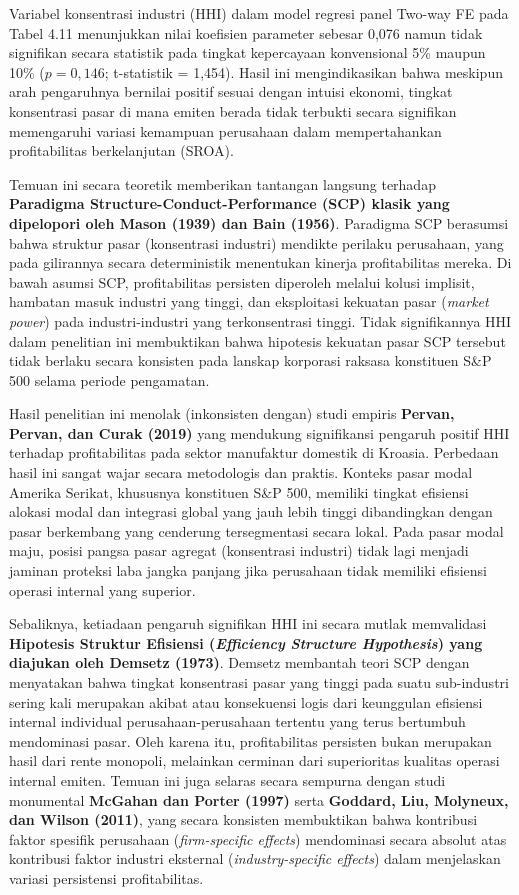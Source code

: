 \documentclass[12pt,a4paper]{article}
\begin{document}
Variabel konsentrasi industri (HHI) dalam model regresi panel Two-way FE
pada Tabel 4.11 menunjukkan nilai koefisien parameter sebesar 0,076
namun tidak signifikan secara statistik pada tingkat kepercayaan
konvensional 5\% maupun 10\% (\(p = 0,146\); t-statistik = 1,454). Hasil
ini mengindikasikan bahwa meskipun arah pengaruhnya bernilai positif
sesuai dengan intuisi ekonomi, tingkat konsentrasi pasar di mana emiten
berada tidak terbukti secara signifikan memengaruhi variasi kemampuan
perusahaan dalam mempertahankan profitabilitas berkelanjutan (SROA).

Temuan ini secara teoretik memberikan tantangan langsung terhadap
\textbf{Paradigma Structure-Conduct-Performance (SCP) klasik yang
dipelopori oleh Mason (1939) dan Bain (1956)}. Paradigma SCP berasumsi
bahwa struktur pasar (konsentrasi industri) mendikte perilaku
perusahaan, yang pada gilirannya secara deterministik menentukan kinerja
profitabilitas mereka. Di bawah asumsi SCP, profitabilitas persisten
diperoleh melalui kolusi implisit, hambatan masuk industri yang tinggi,
dan eksploitasi kekuatan pasar (\emph{market power}) pada
industri-industri yang terkonsentrasi tinggi. Tidak signifikannya HHI
dalam penelitian ini membuktikan bahwa hipotesis kekuatan pasar SCP
tersebut tidak berlaku secara konsisten pada lanskap korporasi raksasa
konstituen S\&P 500 selama periode pengamatan.

Hasil penelitian ini menolak (inkonsisten dengan) studi empiris
\textbf{Pervan, Pervan, dan Curak (2019)} yang mendukung signifikansi
pengaruh positif HHI terhadap profitabilitas pada sektor manufaktur
domestik di Kroasia. Perbedaan hasil ini sangat wajar secara metodologis
dan praktis. Konteks pasar modal Amerika Serikat, khususnya konstituen
S\&P 500, memiliki tingkat efisiensi alokasi modal dan integrasi global
yang jauh lebih tinggi dibandingkan dengan pasar berkembang yang
cenderung tersegmentasi secara lokal. Pada pasar modal maju, posisi
pangsa pasar agregat (konsentrasi industri) tidak lagi menjadi jaminan
proteksi laba jangka panjang jika perusahaan tidak memiliki efisiensi
operasi internal yang superior.

Sebaliknya, ketiadaan pengaruh signifikan HHI ini secara mutlak
memvalidasi \textbf{Hipotesis Struktur Efisiensi (\emph{Efficiency
Structure Hypothesis}) yang diajukan oleh Demsetz (1973)}. Demsetz
membantah teori SCP dengan menyatakan bahwa tingkat konsentrasi pasar
yang tinggi pada suatu sub-industri sering kali merupakan akibat atau
konsekuensi logis dari keunggulan efisiensi internal individual
perusahaan-perusahaan tertentu yang terus bertumbuh mendominasi pasar.
Oleh karena itu, profitabilitas persisten bukan merupakan hasil dari
rente monopoli, melainkan cerminan dari superioritas kualitas operasi
internal emiten. Temuan ini juga selaras secara sempurna dengan studi
monumental \textbf{McGahan dan Porter (1997)} serta \textbf{Goddard,
Liu, Molyneux, dan Wilson (2011)}, yang secara konsisten membuktikan
bahwa kontribusi faktor spesifik perusahaan (\emph{firm-specific
effects}) mendominasi secara absolut atas kontribusi faktor industri
eksternal (\emph{industry-specific effects}) dalam menjelaskan variasi
persistensi profitabilitas.
\end{document}
